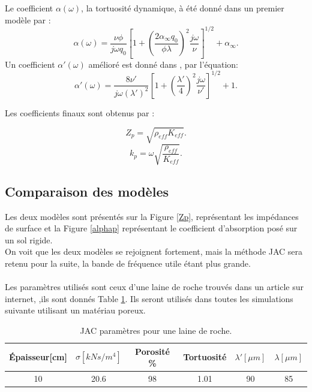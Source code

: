 \documentclass[12pt,foolscap]{report}
\begin{document}
	Le coefficient $\alpha(\omega)$, la tortuosité dynamique, à été donné dans un premier modèle par  \cite{johnson_theory_1987} :
	\begin{equation}
	\alpha(\omega) = \frac{\nu \phi }{j \omega q_0} \left[1 + \left(\frac{2\alpha_\infty q_0}{\phi \lambda}\right)^2 \frac{j \omega}{\nu} \right]^{1/2}+\alpha_\infty\text{.}
	\label{dtortue}
	\end{equation}
	Un coefficient $\alpha'(\omega)$ amélioré est donné dans \cite{champoux_dynamic_1991}, par l'équation: 
	\begin{equation}
	\alpha'(\omega)= \frac{8\nu'}{j \omega (\lambda')^2 }\left[ 1+ \left(\frac{\lambda'}{4}\right)^2 \frac{j \omega}{\nu'} \right]^{1/2}+1\text{.}
	\end{equation}
	
	Les coefficients finaux sont obtenus par :
	
	\begin{equation}
	Z_p= \sqrt{ \rho_{eff} K_{eff} } \text{.}
	\end{equation}
	\begin{equation}
	k_p=\omega \sqrt{ \frac{ \rho_{eff} }{ K_{eff} } } \text{.}
	\end{equation}
	
	\subsection{Comparaison des modèles}
	Les deux modèles sont présentés sur la Figure \ref{Zp}, représentant les impédances de surface et la Figure \ref{alphap} représentant le coefficient d'absorption posé sur un sol rigide. \\
	On voit que les deux modèles se rejoignent fortement, mais la méthode JAC sera retenu pour la suite, la bande de fréquence utile étant plus grande. \\ \\
	Les paramètres utilisés sont ceux d'une laine de roche trouvés dans un article sur internet, \cite{gle_acoustique_2013},ils sont donnés Table \ref{tab:porous}. Ils seront utilisés dans toutes les simulations suivante utilisant un matériau poreux.
	\begin{table}[h]
		\centering
		\begin{tabular}{|c|c|c|c|c|c|}
			\hline
			Épaisseur[cm] & $\sigma [kNs/m^4]$ & Porosité \% & Tortuosité  & $\lambda' [\mu m]$ & $\lambda [\mu m]$ \\ \hline
			10 & 20.6 & 98 & 1.01 & 90 & 85\\ \hline
		\end{tabular}
		\caption{JAC paramètres pour une laine de roche.}
		\label{tab:porous}
	\end{table}
	
\end{document}
